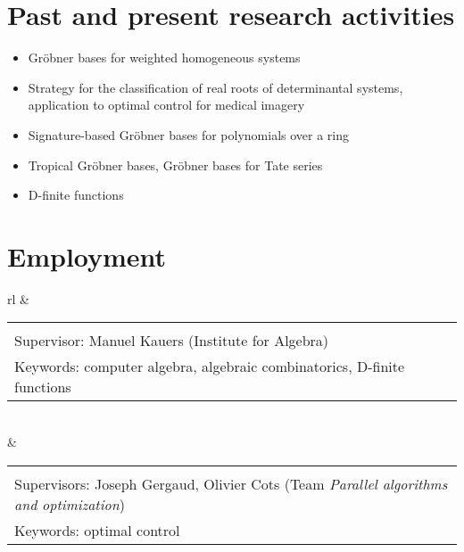 \documentclass{scrartcl}
\makeatletter
\newcommand{\pbox}[2][l]{%
  \renewcommand{\arraystretch}{1}%
  \begin{tabular}[t]{@{}#1@{}}#2\end{tabular}%
}
\makeatother
\begin{document}


\section*{Past and present research activities}

\begin{itemize}[itemsep=0pt]
  \item Gröbner bases for weighted homogeneous systems
  \item Strategy for the classification of real roots of determinantal systems, \\
  application to optimal control for medical imagery
  \item Signature-based Gröbner bases for polynomials over a ring
  \item Tropical Gröbner bases, Gröbner bases for Tate series
  \item D-finite functions
\end{itemize}

\section*{Employment}
\label{sec:Previous-positions}

\renewcommand{\arraystretch}{1.5}

\begin{tabular}{rl}
   & \pbox{\structure{Post-doctoral researcher at JKU (Linz, Austria)}\\
    Supervisor: Manuel Kauers (Institute for Algebra)\\
    Keywords: computer algebra, algebraic combinatorics, D-finite functions%
  }\\
   & \pbox{\structure{Post-doctoral researcher at INP-ENSEEIHT (Toulouse, France)}\\
  Supervisors: Joseph Gergaud, Olivier Cots  (Team \emph{Parallel algorithms}\emph{ and optimization})\\
  Keywords: optimal control
} 
\end{tabular}
\end{document}

